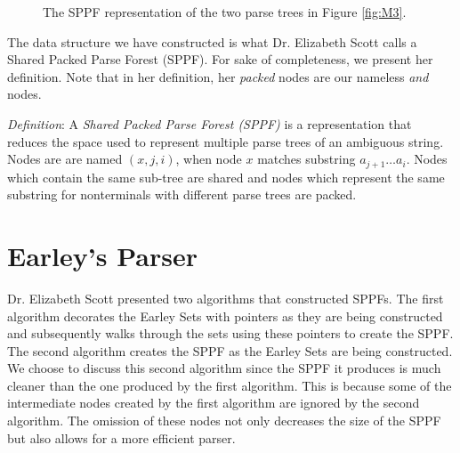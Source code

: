 \documentclass{sigplanconf}
\begin{document}
\begin{figure}
\begin{center}
\caption{The SPPF representation of the two parse trees in Figure \ref{fig:M3}.} \label{fig:M5}
\end{center}	
\end{figure}

The data structure we have constructed is what Dr. Elizabeth Scott calls a Shared Packed Parse Forest (SPPF). For sake of completeness, we present her definition. Note that in her definition, her \textit{packed} nodes are our nameless \textit{and} nodes.

\textit{Definition}: A \textit{Shared Packed Parse Forest (SPPF)} is a representation that reduces the space used to represent multiple parse trees of an ambiguous string. Nodes are are named $(x,j,i)$, when node $x$ matches substring $a_{j+1}\dots{a_i}$. Nodes which contain the same sub-tree are shared and nodes which represent the same substring for nonterminals with different parse trees are packed. 

\section{Earley's Parser}
Dr. Elizabeth Scott presented two algorithms that constructed SPPFs. The first algorithm decorates the Earley Sets with pointers as they are being constructed and subsequently walks through the sets using these pointers to create the SPPF. The second algorithm creates the SPPF as the Earley Sets are being constructed. We choose to discuss this second algorithm since the SPPF it produces is much cleaner than the one produced by the first algorithm. This is because some of the intermediate nodes created by the first algorithm are ignored by the second algorithm. The omission of these nodes not only decreases the size of the SPPF but also allows for a more efficient parser. 
 
\end{document}
